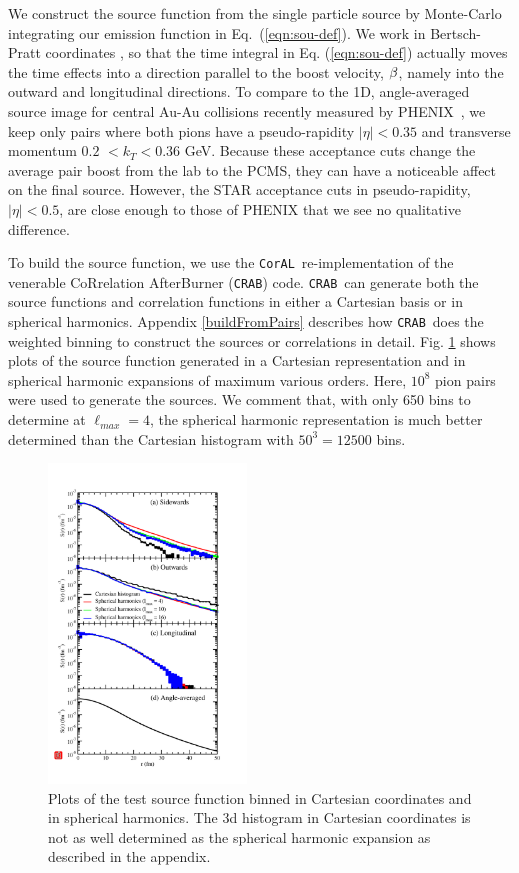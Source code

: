 \documentclass[aps,prl,twocolumn,floatfix,preprintnumbers,showpacs]{revtex4}
\newcommand{\CorAL}{{\tt CorAL}}
\newcommand{\CRAB}{{\tt CRAB}}
\begin{document}
We construct the source function from the single particle source by Monte-Carlo integrating our emission function in Eq.~(\ref{eqn:sou-def}).  We work in Bertsch-Pratt coordinates \cite{pratt_90}, so that the time integral in Eq. (\ref{eqn:sou-def}) actually moves the time effects into a direction parallel to the boost velocity, $\boldmath \beta$, namely into the outward and longitudinal directions.  To compare to the 1D, angle-averaged source image for central Au-Au collisions recently measured by PHENIX~\cite{ppg052}, we keep only pairs where both pions have a pseudo-rapidity $|\eta|<0.35$ and transverse momentum $0.2$ $< k_{T} < 0.36$ GeV.  Because these acceptance cuts change the average pair boost from the lab to the PCMS, they can have a noticeable affect on the final source.  However, the STAR acceptance cuts in pseudo-rapidity, $|\eta|<0.5$, are close enough to those of PHENIX that we see no qualitative difference.

To build the source function, we use the \CorAL\ re-implementation of the venerable CoRrelation AfterBurner (\CRAB) code.  \CRAB\ can generate both the source functions and correlation functions in either a Cartesian basis or in spherical harmonics.  Appendix \ref{buildFromPairs} describes how \CRAB\ does the weighted binning to construct the sources or correlations in detail.  Fig. \ref{srcTail} shows plots of the source function generated in a Cartesian representation and in spherical harmonic expansions of maximum various orders.  Here, $10^{8}$ pion pairs were used to generate the sources.  We comment that, with only 650 bins to determine at $\ell_{max} = 4$, the spherical harmonic representation is much better determined than the Cartesian histogram with $50^{3} = 12500$ bins.           

\begin{figure}
\includegraphics[width=0.47\textwidth]{chum_source_4panel}    
\caption{\label{srcTail} Plots of the test source function binned in Cartesian coordinates and in spherical harmonics.  The 3d histogram in Cartesian coordinates is not as well determined as the spherical harmonic expansion as described in the appendix.}    
\end{figure}
\end{document}
